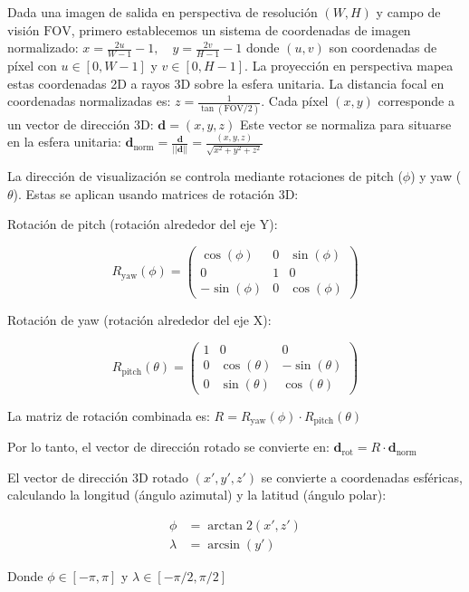 Dada una imagen de salida en perspectiva de resolución $(W, H)$ y campo de visión $\text{FOV}$, primero establecemos un sistema de coordenadas de imagen normalizado:
$x = \frac{2u}{W-1} - 1, \quad y = \frac{2v}{H-1} - 1$
donde $(u, v)$ son coordenadas de píxel con $u \in [0, W-1]$ y $v \in [0, H-1]$.
La proyección en perspectiva mapea estas coordenadas 2D a rayos 3D sobre la esfera unitaria. La distancia focal en coordenadas normalizadas es:
$z = \frac{1}{\tan(\text{FOV}/2)}$.
Cada píxel $(x, y)$ corresponde a un vector de dirección 3D:
$\mathbf{d} = (x, y, z)$
Este vector se normaliza para situarse en la esfera unitaria:
$\mathbf{d}_{\text{norm}} = \frac{\mathbf{d}}{||\mathbf{d}||} = \frac{(x, y, z)}{\sqrt{x^2 + y^2 + z^2}}$

La dirección de visualización se controla mediante rotaciones de pitch ($\phi$) y yaw ($\theta$). Estas se aplican usando matrices de rotación 3D:

Rotación de pitch (rotación alrededor del eje Y):

$$R_{\text{yaw}}(\phi) = \begin{pmatrix}
\cos(\phi) & 0 & \sin(\phi) \\
0 & 1 & 0 \\
-\sin(\phi) & 0 & \cos(\phi)
\end{pmatrix}$$

Rotación de yaw (rotación alrededor del eje X):

$$R_{\text{pitch}}(\theta) = \begin{pmatrix}
1 & 0 & 0 \\
0 & \cos(\theta) & -\sin(\theta) \\
0 & \sin(\theta) & \cos(\theta)
\end{pmatrix}$$

La matriz de rotación combinada es:
$R = R_{\text{yaw}}(\phi) \cdot R_{\text{pitch}}(\theta)$

Por lo tanto, el vector de dirección rotado se convierte en:
$\mathbf{d}_{\text{rot}} = R \cdot \mathbf{d}_{\text{norm}}$


El vector de dirección 3D rotado $(x', y', z')$ se convierte a coordenadas esféricas, calculando la longitud (ángulo azimutal) y la latitud (ángulo polar):


\begin{align}
\phi &= \arctan2(x', z')\\
\lambda &= \arcsin(y')
\end{align}

Donde $\phi \in [-\pi, \pi]$ y $\lambda \in [-\pi/2, \pi/2]$

